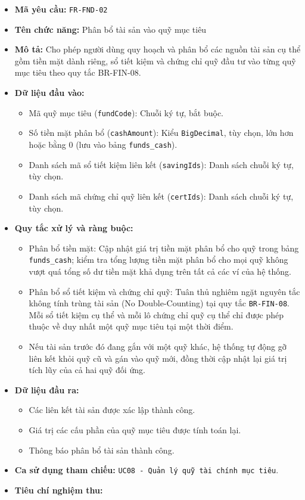 \documentclass[11pt,a4paper]{article}
\providecommand{\tightlist}{
  \setlength{\itemsep}{0pt}\setlength{\parskip}{0pt}}
\begin{document}
\begin{itemize}
\tightlist
\item
  \textbf{Mã yêu cầu:} \texttt{FR-FND-02}
\item
  \textbf{Tên chức năng:} Phân bổ tài sản vào quỹ mục tiêu
\item
  \textbf{Mô tả:} Cho phép người dùng quy hoạch và phân bổ các nguồn tài
  sản cụ thể gồm tiền mặt dành riêng, sổ tiết kiệm và chứng chỉ quỹ đầu
  tư vào từng quỹ mục tiêu theo quy tắc BR-FIN-08.
\item
  \textbf{Dữ liệu đầu vào:}

  \begin{itemize}
  \tightlist
  \item
    Mã quỹ mục tiêu (\texttt{fundCode}): Chuỗi ký tự, bắt buộc.
  \item
    Số tiền mặt phân bổ (\texttt{cashAmount}): Kiểu \texttt{BigDecimal},
    tùy chọn, lớn hơn hoặc bằng 0 (lưu vào bảng \texttt{funds\_cash}).
  \item
    Danh sách mã sổ tiết kiệm liên kết (\texttt{savingIds}): Danh sách
    chuỗi ký tự, tùy chọn.
  \item
    Danh sách mã chứng chỉ quỹ liên kết (\texttt{certIds}): Danh sách
    chuỗi ký tự, tùy chọn.
  \end{itemize}
\item
  \textbf{Quy tắc xử lý và ràng buộc:}

  \begin{itemize}
  \tightlist
  \item
    Phân bổ tiền mặt: Cập nhật giá trị tiền mặt phân bổ cho quỹ trong
    bảng \texttt{funds\_cash}; kiểm tra tổng lượng tiền mặt phân bổ cho
    mọi quỹ không vượt quá tổng số dư tiền mặt khả dụng trên tất cả các
    ví của hệ thống.
  \item
    Phân bổ sổ tiết kiệm và chứng chỉ quỹ: Tuân thủ nghiêm ngặt nguyên
    tắc không tính trùng tài sản (No Double-Counting) tại quy tắc
    \texttt{BR-FIN-08}. Mỗi sổ tiết kiệm cụ thể và mỗi lô chứng chỉ quỹ
    cụ thể chỉ được phép thuộc về duy nhất một quỹ mục tiêu tại một thời
    điểm.
  \item
    Nếu tài sản trước đó đang gắn với một quỹ khác, hệ thống tự động gỡ
    liên kết khỏi quỹ cũ và gán vào quỹ mới, đồng thời cập nhật lại giá
    trị tích lũy của cả hai quỹ đối ứng.
  \end{itemize}
\item
  \textbf{Dữ liệu đầu ra:}

  \begin{itemize}
  \tightlist
  \item
    Các liên kết tài sản được xác lập thành công.
  \item
    Giá trị các cấu phần của quỹ mục tiêu được tính toán lại.
  \item
    Thông báo phân bổ tài sản thành công.
  \end{itemize}
\item
  \textbf{Ca sử dụng tham chiếu:}
  \texttt{UC08\ -\ Quản\ lý\ quỹ\ tài\ chính\ mục\ tiêu}.
\item
  \textbf{Tiêu chí nghiệm thu:}


\end{itemize}
\end{document}
